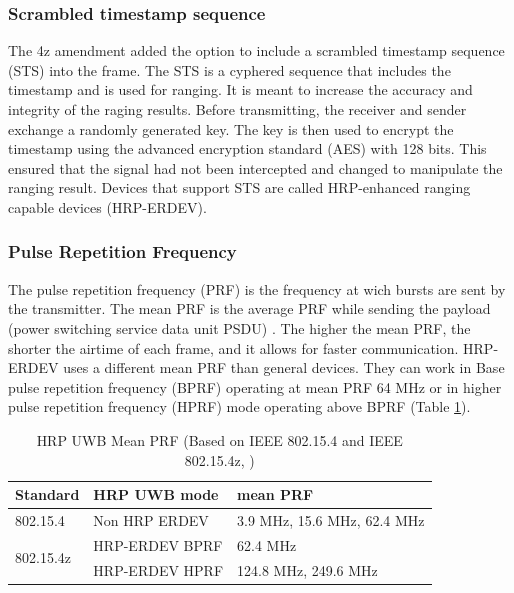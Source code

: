 \subsubsection{Scrambled timestamp sequence}

The 4z amendment added the option to include a scrambled timestamp sequence (STS) into the frame.
The STS is a cyphered sequence that includes the timestamp and is used for ranging.
It is meant to increase the accuracy and integrity of the raging results.
Before transmitting, the receiver and sender exchange a randomly generated key.
The key is then used to encrypt the timestamp using the advanced encryption standard (AES) with 128 bits.
This ensured that the signal had not been intercepted and changed to manipulate the ranging result.
Devices that support STS are called HRP-enhanced ranging capable
devices (HRP-ERDEV).

\subsubsection{Pulse Repetition Frequency}
\label{sec:pule repetition frequency}
The pulse repetition frequency (PRF) is the frequency at wich bursts are sent by the transmitter.
The mean PRF is the average PRF while sending the payload (power switching service data unit PSDU) \cite{hsu_2021}.
The higher the mean PRF, the shorter the airtime of each frame, and it allows for faster communication.
HRP-ERDEV uses a different mean PRF than general devices.
They can work in Base pulse repetition frequency (BPRF) operating at mean PRF 64 MHz or in higher pulse repetition frequency (HPRF) mode operating above BPRF (Table \ref{f:mean PRF}).

\begin{table}[ht!]
\centering
\begin{tabular}{|l|l|l|} 
\hline
\textbf{Standard}          & \textbf{HRP UWB mode} & \textbf{mean PRF}            \\ 
\hline
802.15.4                   & Non HRP ERDEV         & 3.9 MHz, 15.6 MHz, 62.4 MHz  \\ 
\hline
\multirow{2}{*}{802.15.4z} & HRP-ERDEV BPRF        & 62.4 MHz                     \\ 
\cline{2-3}
                           & HRP-ERDEV HPRF        & 124.8 MHz, 249.6 MHz         \\
\hline
\end{tabular}
\caption{HRP UWB Mean PRF (Based on IEEE 802.15.4 and IEEE 802.15.4z, \cite{IEEE4-2020-7, IEEE4z})}
\label{f:mean PRF}
\end{table} %

